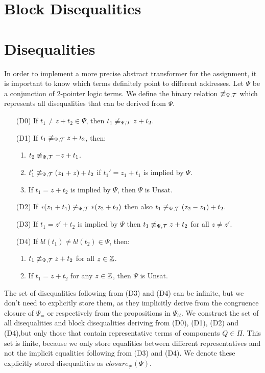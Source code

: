 \section{Block Disequalities}


\section{Disequalities}\label{disequalities}

In order to implement a more precise abstract transformer for the assignment, it is important to know which terms definitely
point to different addresses. Let $\Psi$ be a conjunction of 2-pointer logic terms.
We define the binary relation $\not\equiv_{\Psi,\mathcal{T}}$ which represents all disequalities that can be derived from $\Psi$.

\begin{enumerate}
  \item[(D0)] If $t_1 \neq z + t_2 \in \Psi$, then $t_1 \not\equiv_{\Psi,\mathcal{T}} z + t_2$.
  \item[(D1)] If $t_1 \not\equiv_{\Psi,\mathcal{T}} z + t_2$, then:
    \begin{enumerate}
      \item $t_2 \not\equiv_{\Psi,\mathcal{T}} - z + t_1$.
      \item $t'_1\not\equiv_{\Psi,\mathcal{T}} (z_1 + z) + t_2$ if $t_1' = z_1 + t_1$ is implied by $\Psi$.
      \item If $t_1 = z + t_2$ is implied by $\Psi$, then $\Psi$ is Unsat.
    \end{enumerate}
  \item[(D2)] If $*(z_1 + t_1) \not\equiv_{\Psi,\mathcal{T}} *(z_2 + t_2)$ then also $t_1 \not\equiv_{\Psi,\mathcal{T}} (z_2 - z_1) + t_2$.
  \item[(D3)] If $t_1 = z' + t_2$ is implied by $\Psi$ then $t_1 \not\equiv_{\Psi,\mathcal{T}} z + t_2$ for all $z \neq z'$.
  \item[(D4)] If $bl(t_1) \neq bl(t_2) \in \Psi$, then:
    \begin{enumerate}
      \item $t_1 \not\equiv_{\Psi,\mathcal{T}} z + t_2$ for all $z \in \mathbb{Z}$.
      \item If $t_1 = z + t_2$ for any $z \in \mathbb{Z}$, then $\Psi$ is Unsat.
    \end{enumerate}
\end{enumerate}

The set of disequalities following from (D3) and (D4) can be infinite, but we don't need to explicitly store them, as they implicitly derive from the congruence closure of $\Psi_=$ or respectively from the propositions in $\Psi_{bl}$.
We construct the set of all disequalities and block disequalities deriving from (D0), (D1), (D2) and (D4),but only those that contain representative terms of components $Q\in\Pi$.
This set is finite, because we only store equalities between different representatives and not the implicit equalities following from (D3) and (D4).
We denote these explicitly stored disequalities as $closure_\neq(\Psi)$.

